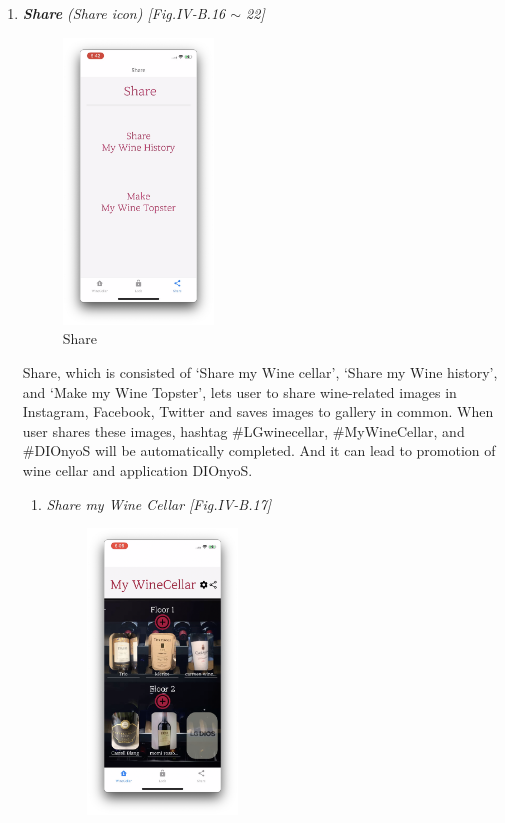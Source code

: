 \documentclass[conference]{IEEEtran}
\numberwithin{figure}{subsection}
\begin{document}
\begin{enumerate}
\begin{enumerate}
        \item \textit{\textbf{Share} (Share icon) [Fig.IV-B.16 $\sim$ 22]}\\
        \begin{figure}[htb!]
            \centerline{\includegraphics[width=4cm]{share.png}}
            \caption{Share}
        \end{figure}
        Share, which is consisted of ‘Share my Wine cellar’, ‘Share my Wine history’, and ‘Make my Wine Topster’, lets user to share wine-related images in Instagram, Facebook, Twitter and saves images to gallery in common. When user shares these images, hashtag \#LGwinecellar, \#MyWineCellar, and \#DIOnyoS will be automatically completed. And it can lead to promotion of wine cellar and application DIOnyoS.
        \begin{enumerate}
            \item \textit{Share my Wine Cellar [Fig.IV-B.17]}\\
            \begin{figure}[htb!]
                \centerline{\includegraphics[width=4cm]{sharecel.png}}

\end{figure}
\end{enumerate}
\end{enumerate}
\end{enumerate}
\end{document}
